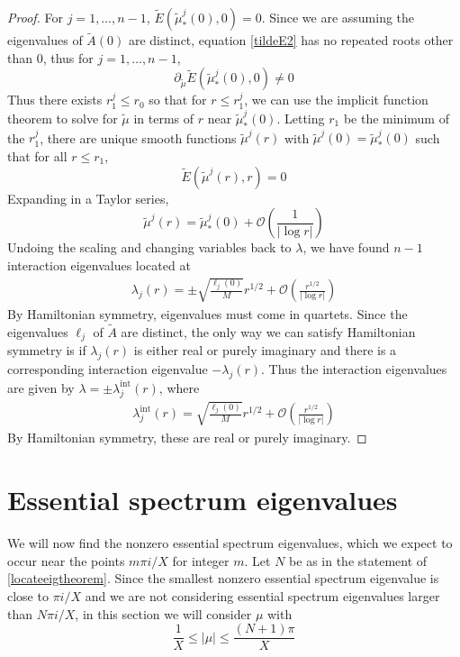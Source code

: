 \documentclass[thesis.tex]{subfiles}
\begin{document}
\begin{lemma}
\begin{proof}
For $j = 1, \dots, n-1$, $\tilde{E}(\tilde{\mu}_*^j(0), 0) = 0$. Since we are assuming the eigenvalues of $\tilde{A}(0)$ are distinct, equation \cref{tildeE2} has no repeated roots other than $0$, thus for $j = 1, \dots, n-1$,
\[
\partial_{\tilde{\mu}} \tilde{E}(\tilde{\mu}_*^j(0), 0) \neq 0
\]
Thus there exists $r_1^j \leq r_0$ so that for $r \leq r_1^j$, we can use the implicit function theorem to solve for $\tilde{\mu}$ in terms of $r$ near $\tilde{\mu}_*^j(0)$. Letting $r_1$ be the minimum of the $r_1^j$, there are unique smooth functions $\tilde{\mu}^j(r)$ with $\tilde{\mu}^j(0) = \tilde{\mu}_*^j(0)$ such that for all $r \leq r_1$,
\[
\tilde{E}(\tilde{\mu}^j(r), r) = 0
\]
Expanding in a Taylor series,
\[
\tilde{\mu}^j(r) = \tilde{\mu}_*^j(0) + \mathcal{O}\left( \frac{1}{|\log r|} \right)
\]
Undoing the scaling and changing variables back to $\lambda$, we have found $n-1$ interaction eigenvalues located at
\begin{align*}
\lambda_j(r) = \pm \sqrt{\frac{\ell_j(0)}{M}} r^{1/2} + \mathcal{O}\left( \frac{r^{1/2}}{|\log r|} \right)
\end{align*}
By Hamiltonian symmetry, eigenvalues must come in quartets. Since the eigenvalues $\ell_j$ of $\tilde{A}$ are distinct, the only way we can satisfy Hamiltonian symmetry is if $\lambda_j(r)$ is either real or purely imaginary and there is a corresponding interaction eigenvalue $-\lambda_j(r)$. Thus the interaction eigenvalues are given by $\lambda = \pm \lambda^{\text{int}}_j(r)$, where
\begin{align*}
\lambda^{\text{int}}_j(r) = \sqrt{\frac{\ell_j(0)}{M}} r^{1/2} + \mathcal{O}\left( \frac{r^{1/2}}{|\log r|} \right)
\end{align*}
By Hamiltonian symmetry, these are real or purely imaginary.
\end{proof}
\end{lemma}

\section{Essential spectrum eigenvalues}

We will now find the nonzero essential spectrum eigenvalues, which we expect to occur near the points $m \pi i/X$ for integer $m$. Let $N$ be as in the statement of \cref{locateeigtheorem}. Since the smallest nonzero essential spectrum eigenvalue is close to $\pi i/X$ and we are not considering essential spectrum eigenvalues larger than $N \pi i/X$, in this section we will consider $\mu$ with
\begin{equation}\label{mucondess}
\frac{1}{X} \leq |\mu| \leq \frac{(N+1)\pi}{X}
\end{equation}
\end{document}
